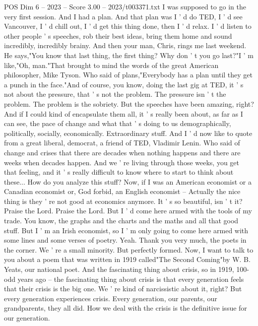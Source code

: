 \begin{textsample}{POS Dim 6 – 2023 – Score 3.00 – 2023/t003371.txt}  \label{ex:f6_pos_071}
I was supposed to go in the very first session.
And I had a plan.
And that plan was I ' d do TED, I ' d see Vancouver, I ' d chill out, I ' d get this thing done, then I ' d relax.
I ' d listen to other people ' s speeches, rob their best ideas, bring them home and sound incredibly, incredibly brainy.
And then your man, Chris, rings me last weekend.
He says,"You know that last thing, the first thing?
Why don ' t you go last?"I ' m like,"Oh, man."That brought to mind the words of the great American philosopher, Mike Tyson.
Who said of plans,"Everybody has a plan until they get a punch in the face."And of course, you know, doing the last gig at TED, it ' s not about the pressure, that ' s not the problem.
The pressure isn ' t the problem.
The problem is the sobriety.
But the speeches have been amazing, right?
And if I could kind of encapsulate them all, it ' s really been about, as far as I can see, the pace of change and what that ' s doing to us demographically, politically, socially, economically.
Extraordinary stuff.
And I ' d now like to quote from a great liberal, democrat, a friend of TED, Vladimir Lenin.
Who said of change and crises that there are decades when nothing happens and there are weeks when decades happen.
And we ' re living through those weeks, you get that feeling, and it ' s really difficult to know where to start to think about these...
How do you analyze this stuff?
Now, if I was an American economist or a Canadian economist or, God forbid, an English economist -- Actually the nice thing is they ' re not good at economics anymore.
It ' s so beautiful, isn ' t it?
Praise the Lord.
Praise the Lord.
But I ' d come here armed with the tools of my trade.
You know, the graphs and the charts and the maths and all that good stuff.
But I ' m an Irish economist, so I ' m only going to come here armed with some lines and some verses of poetry.
Yeah.
Thank you very much, the poets in the corner.
We ' re a small minority.
But perfectly formed.
Now, I want to talk to you about a poem that was written in 1919 called"The Second Coming"by W.
B.
Yeats, our national poet.
And the fascinating thing about crisis, so in 1919, 100-odd years ago -- the fascinating thing about crisis is that every generation feels that their crisis is the big one.
We ' re kind of narcissistic about it, right?
But every generation experiences crisis.
Every generation, our parents, our grandparents, they all did.
How we deal with the crisis is the definitive issue for our generation.

\end{textsample}
